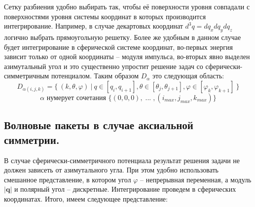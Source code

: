 \documentclass[a4paper,12pt]{article}
\newcommand{\vect}[1]{\boldsymbol{#1}}
\begin{document}
Сетку разбиения удобно выбирать так, чтобы её поверхности уровня совпадали с поверхностями уровня системы координат в которых производится интегрирование. Например, в случае декартовых координат $d^3q = dq_xdq_ydq_z$ логично выбрать прямоугольную решетку. Более же удобным в данном случае будет интегрирование в сферической системе координат, во-первых энергия зависит только от одной координаты – модуля импульса, во-вторых явно выделен азимутальный угол и это существенно упростит решение задач со сферически-симметричным потенциалом. Таким образом $D_\alpha$ это следующая область:
\[
 D_{\alpha(i,j,k)} = \big\{ \: (k,\theta,\varphi) \: \big| \: q \in [q_i,q_{i+1}], \theta \in [\theta_j,\theta_{j+1}], \varphi \in [\varphi_k,\varphi_{k+1}] \: \big\} 
\]\[
 \alpha \text{ нумерует сочетания } \big\{ (0,0,0), \; ... \; , (i_{max},j_{max},k_{max}) \big\}
\]
\newline
	\subsection{Волновые пакеты в случае аксиальной симметрии.}
В случае сферически-симметричного потенциала результат решения задачи не должен зависеть от азимутального угла. При этом удобно использовать смешанное представление, в котором угол $\varphi$ – непрерывная переменная, а модуль $|\vect{q}|$ и полярный угол – дискретные. Интегрирование проведем в сферических координатах. Итого, имеем следующее представление:
\end{document}
